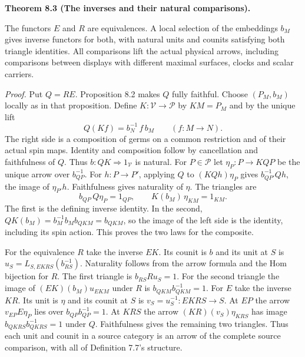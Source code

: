 \documentclass[
  english,
  11pt,
  reqno]{amsart}
\makeatletter
\newcommand{\pandocstatementheading}[1]{%
  \par\if@nobreak\else
    \addpenalty{\@beginparpenalty}%
    \addvspace{.5\baselineskip plus .2\baselineskip minus .2\baselineskip}%
  \fi
  {\normalfont\bfseries #1\par}%
  \nobreak\@afterindenttrue\@afterheading
}
\makeatother
\begin{document}
\pandocstatementheading{\leavevmode{}\label{thm:local-two-inverses}Theorem 8.3 (The inverses and their natural comparisons).}

The functors \(E\) and \(R\) are equivalences. A local selection of the
embeddings \(b_M\) gives inverse functors for both, with natural units
and counits satisfying both triangle identities. All comparisons lift
the actual physical arrows, including comparisons between displays with
different maximal surfaces, clocks and scalar carriers.

\emph{Proof.} Put \(Q=RE\). Proposition 8.2 makes \(Q\) fully faithful.
Choose \((P_M,b_M)\) locally as in that proposition. Define
\(K:\mathcal V\to\mathcal P\) by \(K M=P_M\) and by the unique lift%
 \[
Q(K f)= b_N^{-1}\,f\, b_M
\qquad (f:M\longrightarrow N).
\] The right side is a composition of germs on a common restriction and
of their actual spin maps. Identity and composition follow by
cancellation and faithfulness of \(Q\). Thus
\(b:QK\Rightarrow 1_{\mathcal V}\) is natural. For \(P\in\mathcal P\)
let \(\eta_P:P\to KQP\) be the unique arrow over \(b_{QP}^{-1}\). For
\(h:P\to P'\), applying \(Q\) to \((KQh)\eta_P\) gives
\(b_{QP'}^{-1} Q h\), the image of \(\eta_{P'}h\). Faithfulness gives
naturality of \(\eta\). The triangles are%
 \[
b_{QP}\,Q\eta_P=1_{QP},\qquad K(b_M)\,\eta_{KM}=1_{KM}.
\] The first is the defining inverse identity. In the second,
\(QK(b_M)=b_M^{-1}b_M b_{QKM}=b_{QKM}\), so the image of the left side
is the identity, including its spin action. This proves the two laws for
the composite.

For the equivalence \(R\) take the inverse \(E K\). Its counit is \(b\)
and its unit at \(S\) is \(u_S=L_{S,EKRS}(b_{RS}^{-1})\). Naturality
follows from the arrow formula and the Hom bijection for \(R\). The
first triangle is \(b_{RS} R u_S=1\). For the second triangle the image
of \((EK)(b_M)u_{EKM}\) under \(R\) is \(b_{QKM}b_{QKM}^{-1}=1\). For
\(E\) take the inverse \(K R\). Its unit is \(\eta\) and its counit at
\(S\) is \(v_S=u_S^{-1}:EKRS\to S\). At \(EP\) the arrow
\(v_{EP} E\eta_P\) lies over \(b_{QP}b_{QP}^{-1}=1\). At \(KRS\) the
arrow \((KR)(v_S)\eta_{KRS}\) has image \(b_{QKRS}b_{QKRS}^{-1}=1\)
under \(Q\). Faithfulness gives the remaining two triangles. Thus each
unit and counit in a source category is an arrow of the complete source
comparison, with all of Definition 7.7's structure.
\end{document}
